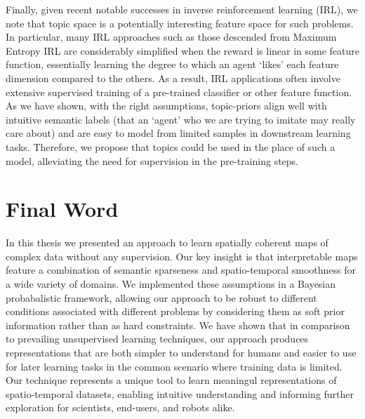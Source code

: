 Finally, given recent notable successes in inverse reinforcement learning (IRL), we note that topic space is a potentially interesting feature space for such problems. In particular, many IRL approaches such as those descended from Maximum Entropy IRL \citep{ziebart2008maximum} are considerably simplified when the reward is linear in some feature function, essentially learning the degree to which an agent `likes' each feature dimension compared to the others. As a result, IRL applications often involve extensive supervised training of a pre-trained classifier or other feature function. As we have shown, with the right assumptions, topic-priors align well with intuitive semantic labels (that an `agent' who we are trying to imitate may really care about) and are easy to model from limited samples in downstream learning tasks. Therefore, we propose that topics could be used in the place of such a model, alleviating the need for supervision in the pre-training steps.

\section{Final Word} \label{sec:conclusion-final-word}
In this thesis we presented an approach to learn spatially coherent maps of complex data without any supervision. Our key insight is that interpretable maps feature a combination of semantic sparseness and spatio-temporal smoothness for a wide variety of domains. We implemented these assumptions in a Bayesian probabalistic framework, allowing our approach to be robust to different conditions associated with different problems by considering them as soft prior information rather than as hard constraints. We have shown that in comparison to prevailing unsupervised learning techniques, our approach produces representations that are both simpler to understand for humans and easier to use for later learning tasks in the common scenario where training data is limited. Our technique represents a unique tool to learn meaningul representations of spatio-temporal datasets, enabling intuitive understanding and informing further exploration for scientists, end-users, and robots alike.